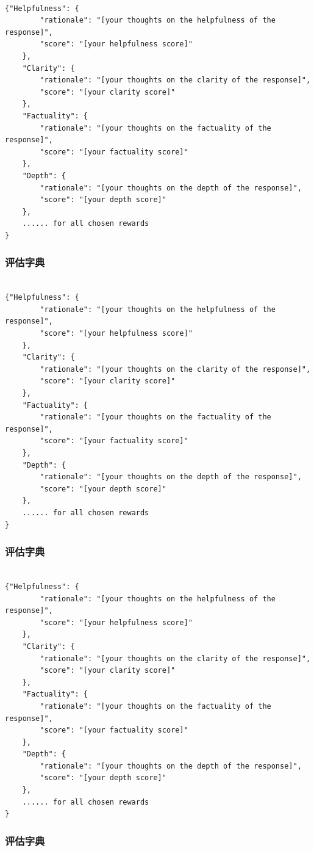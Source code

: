 \label{sec:eval_dict}  
\begin{lstlisting}[breaklines=true,breakatwhitespace=true]

{"Helpfulness": {
        "rationale": "[your thoughts on the helpfulness of the response]",
        "score": "[your helpfulness score]"
    },
    "Clarity": {
        "rationale": "[your thoughts on the clarity of the response]",
        "score": "[your clarity score]"
    },
    "Factuality": {
        "rationale": "[your thoughts on the factuality of the response]",
        "score": "[your factuality score]"
    },
    "Depth": {
        "rationale": "[your thoughts on the depth of the response]",
        "score": "[your depth score]"
    },
    ...... for all chosen rewards
}

\end{lstlisting}  \subsubsection{评估字典}  
\label{sec:eval_dict}  
\begin{lstlisting}[breaklines=true,breakatwhitespace=true]

{"Helpfulness": {
        "rationale": "[your thoughts on the helpfulness of the response]",
        "score": "[your helpfulness score]"
    },
    "Clarity": {
        "rationale": "[your thoughts on the clarity of the response]",
        "score": "[your clarity score]"
    },
    "Factuality": {
        "rationale": "[your thoughts on the factuality of the response]",
        "score": "[your factuality score]"
    },
    "Depth": {
        "rationale": "[your thoughts on the depth of the response]",
        "score": "[your depth score]"
    },
    ...... for all chosen rewards
}

\end{lstlisting}  \subsubsection{评估字典}  
\label{sec:eval_dict}  
\begin{lstlisting}[breaklines=true,breakatwhitespace=true]

{"Helpfulness": {
        "rationale": "[your thoughts on the helpfulness of the response]",
        "score": "[your helpfulness score]"
    },
    "Clarity": {
        "rationale": "[your thoughts on the clarity of the response]",
        "score": "[your clarity score]"
    },
    "Factuality": {
        "rationale": "[your thoughts on the factuality of the response]",
        "score": "[your factuality score]"
    },
    "Depth": {
        "rationale": "[your thoughts on the depth of the response]",
        "score": "[your depth score]"
    },
    ...... for all chosen rewards
}

\end{lstlisting}  \subsubsection{评估字典}  
